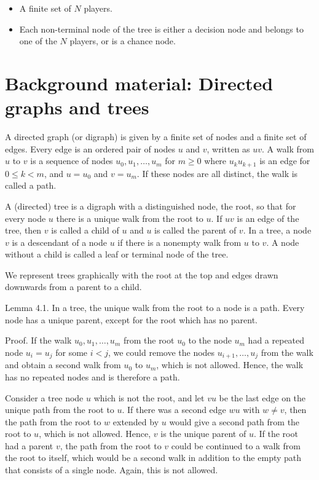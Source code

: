 \documentclass[12pt]{article}
\begin{document}
\begin{itemize}
  \item A finite set of $N$ players.
  \item Each non-terminal node of the tree is either a decision node and belongs to one of the $N$ players, or is a chance node.
\end{itemize}

\section*{Background material: Directed graphs and trees}
A directed graph (or digraph) is given by a finite set of nodes and a finite set of edges. Every edge is an ordered pair of nodes $u$ and $v$, written as $u v$. A walk from $u$ to $v$ is a sequence of nodes $u_{0}, u_{1}, \ldots, u_{m}$ for $m \geq 0$ where $u_{k} u_{k+1}$ is an edge for $0 \leq k<m$, and $u=u_{0}$ and $v=u_{m}$. If these nodes are all distinct, the walk is called a path.

A (directed) tree is a digraph with a distinguished node, the root, so that for every node $u$ there is a unique walk from the root to $u$. If $u v$ is an edge of the tree, then $v$ is called a child of $u$ and $u$ is called the parent of $v$. In a tree, a node $v$ is a descendant of a node $u$ if there is a nonempty walk from $u$ to $v$. A node without a child is called a leaf or terminal node of the tree.

We represent trees graphically with the root at the top and edges drawn downwards from a parent to a child.

Lemma 4.1. In a tree, the unique walk from the root to a node is a path. Every node has a unique parent, except for the root which has no parent.

Proof. If the walk $u_{0}, u_{1}, \ldots, u_{m}$ from the root $u_{0}$ to the node $u_{m}$ had a repeated node $u_{i}=u_{j}$ for some $i<j$, we could remove the nodes $u_{i+1}, \ldots, u_{j}$ from the walk and obtain a second walk from $u_{0}$ to $u_{m}$, which is not allowed. Hence, the walk has no repeated nodes and is therefore a path.

Consider a tree node $u$ which is not the root, and let $v u$ be the last edge on the unique path from the root to $u$. If there was a second edge $w u$ with $w \neq v$, then the path from the root to $w$ extended by $u$ would give a second path from the root to $u$, which is not allowed. Hence, $v$ is the unique parent of $u$. If the root had a parent $v$, the path from the root to $v$ could be continued to a walk from the root to itself, which would be a second walk in addition to the empty path that consists of a single node. Again, this is not allowed.
\end{document}
